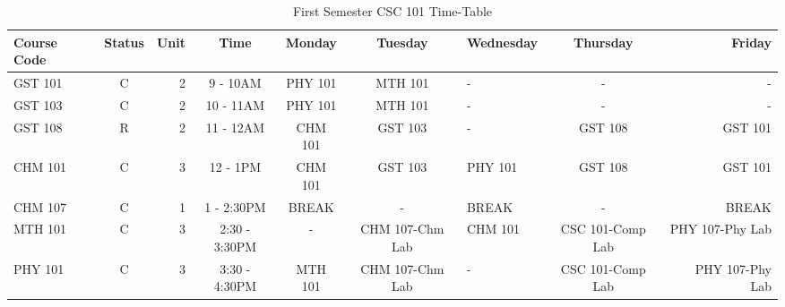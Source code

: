 \documentclass{article}
\begin{document}
	
	\begin{sidewaystable}[h!]
		\begin{center}
			\caption{First Semester CSC 101 Time-Table}
			\label{tab;table1}
			\begin{tabular}{l|c|r|c|c|c|l|c|r|}
			\textbf{\cellcolor{blue!70}Course Code} 
				 & \textbf{\cellcolor{blue!70}Status}  & \textbf{\cellcolor{blue!70}Unit}  & \textbf{\cellcolor{blue!70}Time}  & \textbf{\cellcolor{blue!70}Monday}  & \textbf{\cellcolor{blue!70}Tuesday}  & \textbf{\cellcolor{blue!70}Wednesday}  & \textbf{\cellcolor{blue!70}Thursday}  & \textbf{\cellcolor{blue!70}Friday}\\
				 \hline
			\cellcolor{blue!70}GST 101 & \cellcolor{blue!35} C &\cellcolor{blue!35} 2 &\cellcolor{blue!35} 9 - 10AM & \cellcolor{blue!35}PHY 101 &\cellcolor{blue!35} MTH 101 &\cellcolor{blue!35} - &\cellcolor{blue!35} - & \cellcolor{blue!70}- \\
			\cellcolor{blue!70}GST 103 &\cellcolor{blue!35} C & \cellcolor{blue!35}2 & \cellcolor{blue!35}10 - 11AM &\cellcolor{blue!35} PHY 101 &\cellcolor{blue!35} MTH 101 & \cellcolor{blue!35}- &\cellcolor{blue!35} - & \cellcolor{blue!70}- \\
			\cellcolor{blue!70}GST 108 &\cellcolor{blue!35} R &\cellcolor{blue!35} 2 & \cellcolor{blue!35}11 - 12AM &\cellcolor{blue!35} CHM 101 & \cellcolor{blue!35}GST 103 & \cellcolor{blue!35}- & \cellcolor{blue!35}GST 108 & \cellcolor{blue!70}GST 101 \\
			\cellcolor{blue!70}CHM 101 &\cellcolor{gray!35} C &\cellcolor{gray!35} 3 & \cellcolor{gray!35}12 - 1PM & \cellcolor{gray!35}CHM 101 & \cellcolor{gray!35}GST 103 &\cellcolor{gray!35} PHY 101 & \cellcolor{gray!35}GST 108 & \cellcolor{blue!70}GST 101 \\
			\cellcolor{blue!70}CHM 107 &\cellcolor{gray!35} C & \cellcolor{gray!35}1 & \cellcolor{gray!35}1 - 2:30PM & \cellcolor{gray!35}BREAK &\cellcolor{gray!35} - & \cellcolor{gray!35}BREAK &\cellcolor{gray!35} - &\cellcolor{blue!70} BREAK \\
			\cellcolor{blue!70}MTH 101 & \cellcolor{blue!35}C &\cellcolor{blue!35} 3 & \cellcolor{blue!35}2:30 - 3:30PM & \cellcolor{blue!35}- & \cellcolor{blue!35}CHM 107-Chm Lab & \cellcolor{blue!35}CHM 101 &\cellcolor{blue!35} CSC 101-Comp Lab &\cellcolor{blue!70} PHY 107-Phy Lab                    \\
			\cellcolor{blue!70}PHY 101 &\cellcolor{blue!35} C &\cellcolor{blue!35} 3 & \cellcolor{blue!35}3:30 - 4:30PM &\cellcolor{blue!35} MTH 101 &\cellcolor{blue!35} CHM 107-Chm Lab & \cellcolor{blue!35}-  & \cellcolor{blue!35}CSC 101-Comp Lab & \cellcolor{blue!70}\ PHY 107-Phy Lab                         \\

\end{tabular}
\end{center}
\end{sidewaystable}
\end{document}
